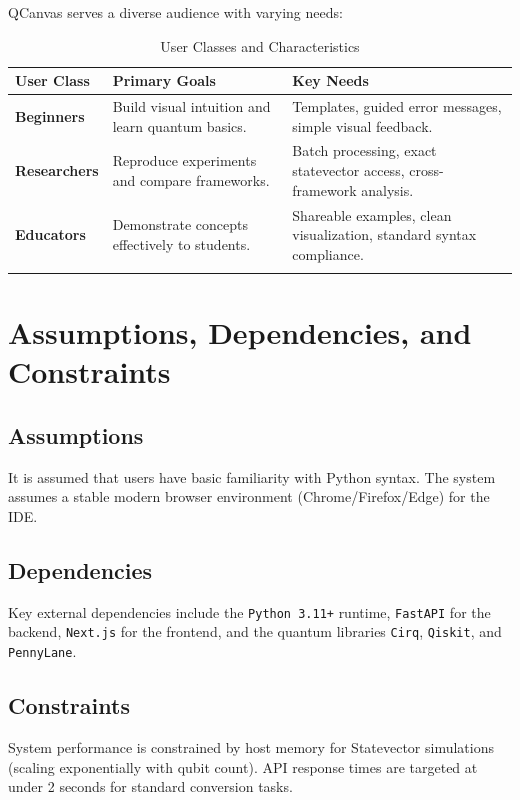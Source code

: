 QCanvas serves a diverse audience with varying needs:

\begin{longtable}{p{} p{} p{}}
\toprule
\textbf{User Class} & \textbf{Primary Goals} & \textbf{Key Needs} \\
\midrule
\endhead
\textbf{Beginners} & Build visual intuition and learn quantum basics. & Templates, guided error messages, simple visual feedback. \\
\addlinespace
\textbf{Researchers} & Reproduce experiments and compare frameworks. & Batch processing, exact statevector access, cross-framework analysis. \\
\addlinespace
\textbf{Educators} & Demonstrate concepts effectively to students. & Shareable examples, clean visualization, standard syntax compliance. \\
\bottomrule

\caption{User Classes and Characteristics}
\label{tab:user-classes}

\end{longtable}

\section{Assumptions, Dependencies, and Constraints}

\subsection{Assumptions}
It is assumed that users have basic familiarity with Python syntax. The system assumes a stable modern browser environment (Chrome/Firefox/Edge) for the IDE.

\subsection{Dependencies}
Key external dependencies include the \texttt{Python 3.11+} runtime, \texttt{FastAPI} for the backend, \texttt{Next.js} for the frontend, and the quantum libraries \texttt{Cirq}, \texttt{Qiskit}, and \texttt{PennyLane}.

\subsection{Constraints}
System performance is constrained by host memory for Statevector simulations (scaling exponentially with qubit count). API response times are targeted at under 2 seconds for standard conversion tasks.
